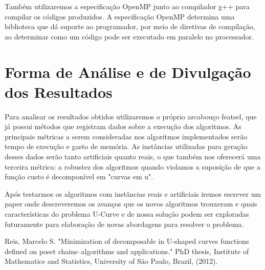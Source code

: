 \documentclass[12pt]{article}
\begin{document}
Também utilizaremos a especificação OpenMP junto ao compilador g++ para
compilar os códigos produzidos. A especificação OpenMP determina uma 
biblioteca que dá suporte ao programador, por meio de diretivas de 
compilação, ao determinar como um código pode ser executado em 
paralelo no processador.


\section{Forma de Análise e de Divulgação dos Resultados}
Para analisar os resultados obtidos utilizaremos o próprio arcabouço
featsel, que já possui métodos que registram dados sobre a execução dos
algoritmos. As principais métricas a serem consideradas nos algoritmos
implementados serão tempo de execução e gasto de memória. As instâncias
utilizadas para geração desses dados serão tanto artificiais quanto 
reais, o que também nos oferecerá uma terceira métrica: a robustez dos
algoritmos quando violamos a suposição de que a função custo é 
decomponível em "curvas em u".

Após testarmos os algoritmos com instâncias reais e artificiais iremos
escrever um paper onde descreveremos os avanços que os novos algoritmos
trouxeram e quais características do problema U-Curve e de nossa solução
podem ser exploradas futuramente para elaboração de novas abordagens 
para resolver o problema.

\begin{thebibliography}{}
    Reis, Marcelo S. "Minimization of decomposable in U-shaped curves 
    functions defined on poset chains–algorithms and applications."
    PhD thesis, Institute of Mathematics and Statistics, University of
    São Paulo, Brazil, (2012).


\end{thebibliography}
\end{document}
